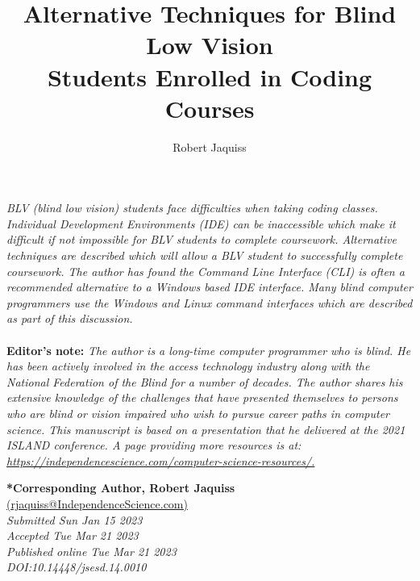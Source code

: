 \documentclass[11.5pt]{sig-alternate}
\makeatletter
\let\oldabstract\abstract
\let\oldendabstract\endabstract
\renewenvironment{abstract}
{\renewenvironment{quotation}%
               {\list{}{\addtolength{\leftmargin}{1em} %
                        \listparindent 1.5em%
                        \itemindent    \listparindent%
                        \rightmargin   \leftmargin%
                        \parsep        \z@ \@plus\p@}%
                \item\relax}%
               {\endlist}%
\oldabstract}
{\oldendabstract}
\makeatother
\begin{document}
\title{Alternative Techniques for Blind Low Vision \\Students Enrolled in Coding Courses}

\author[1]{\large \color{blue} Robert Jaquiss}


\toappear{}

\maketitle
\begin{@twocolumnfalse} 
\begin{abstract}
\begin{large}
\item 
 \textit {BLV (blind low vision) students face difficulties when taking coding classes. Individual Development Environments (IDE) can be inaccessible which make it difficult if not impossible for BLV students to complete coursework. Alternative techniques are described which will allow a BLV student to successfully complete coursework. The author has found the Command Line Interface (CLI) is often a recommended alternative to a Windows based IDE interface. Many blind computer programmers use the Windows and Linux command interfaces which are described as part of this discussion.}
\\
\\
\textbf{Editor’s note:} \textit{The author is a long-time computer programmer who is blind. He has been actively involved in the access technology industry along with the National Federation of the Blind for a number of decades. The author shares his extensive knowledge of the challenges that have presented themselves to persons who are blind or vision impaired who wish to pursue career paths in computer science. This manuscript is based on a presentation that he delivered at the 2021 ISLAND conference. A page providing more resources is at: \url{https://independencescience.com/computer-science-resources/.}}

\end{large}    
\end{abstract}
\end{@twocolumnfalse}





\textbf{*Corresponding Author, Robert Jaquiss }\\
\href{mailto:rjaquiss@IndependenceScience.com }{(rjaquiss@IndependenceScience.com)}\\
\textit{Submitted Sun Jan 15 2023 }\\
\textit{Accepted Tue Mar 21 2023 }\\
\textit{Published online Tue Mar 21 2023}\\
\textit{DOI:10.14448/jsesd.14.0010}\\
\pagebreak
\pagebreak
\end{document}
